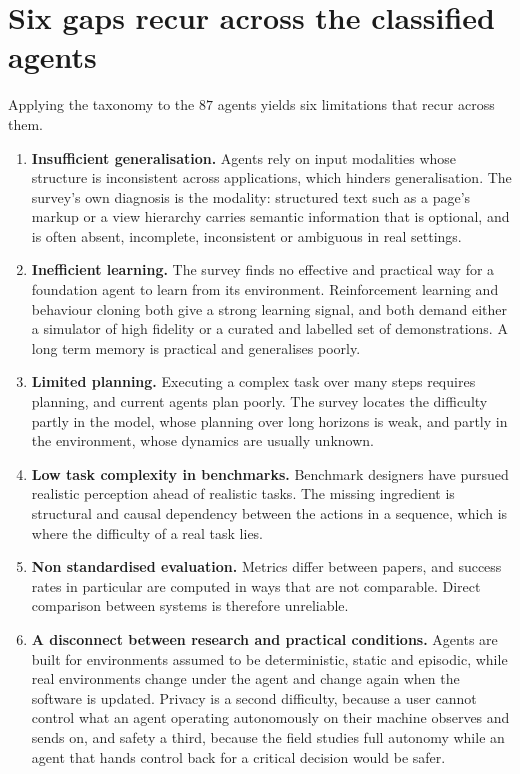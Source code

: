 \section{Six gaps recur across the classified agents}
\label{sec:acu_gaps}

Applying the taxonomy to the $87$ agents yields six limitations that recur across them.

\begin{enumerate}
    \item \textbf{Insufficient generalisation.} Agents rely on input
    modalities whose structure is inconsistent across applications, which
    hinders generalisation. The survey's own diagnosis is the modality:
    structured text such as a page's markup or a view hierarchy carries
    semantic information that is optional, and is often absent, incomplete,
    inconsistent or ambiguous in real settings.

    \item \textbf{Inefficient learning.} The survey finds no effective and
    practical way for a foundation agent to learn from its environment.
    Reinforcement learning and behaviour cloning both give a strong learning
    signal, and both demand either a simulator of high fidelity or a curated
    and labelled set of demonstrations. A long term memory is practical and
    generalises poorly.

    \item \textbf{Limited planning.} Executing a complex task over many steps
    requires planning, and current agents plan poorly. The survey locates the
    difficulty partly in the model, whose planning over long horizons is weak,
    and partly in the environment, whose dynamics are usually unknown.

    \item \textbf{Low task complexity in benchmarks.} Benchmark designers have
    pursued realistic perception ahead of realistic tasks. The missing
    ingredient is structural and causal dependency between the actions in a
    sequence, which is where the difficulty of a real task lies.

    \item \textbf{Non standardised evaluation.} Metrics differ between papers,
    and success rates in particular are computed in ways that are not
    comparable. Direct comparison between systems is therefore unreliable.

    \item \textbf{A disconnect between research and practical conditions.}
    Agents are built for environments assumed to be deterministic, static and
    episodic, while real environments change under the agent and change again
    when the software is updated. Privacy is a second difficulty, because a
    user cannot control what an agent operating autonomously on their machine
    observes and sends on, and safety a third, because the field studies full
    autonomy while an agent that hands control back for a critical decision
    would be safer.
\end{enumerate}

